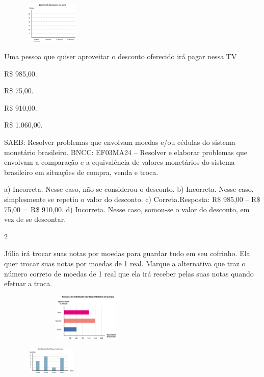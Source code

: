 \begin{escolha}
{\begin{escolha}
\includegraphics[width=1.95850in,height=0.77507in]{media/image81.png}

Uma pessoa que quiser aproveitar o desconto oferecido irá pagar nessa TV

\begin{escolha}

\item
  R\$ 985,00.
\item
  R\$ 75,00.
\item
  R\$ 910,00.
\item
  R\$ 1.060,00.
\end{escolha}

SAEB: Resolver problemas que envolvam moedas e/ou cédulas do sistema monetário brasileiro. 
BNCC: EF03MA24 -- Resolver e elaborar problemas que envolvam a comparação e a equivalência de
valores monetários do sistema brasileiro em situações de compra, venda e troca.

a) Incorreta. Nesse caso, não se considerou o desconto.
b) Incorreta. Nesse caso, simplesmente se repetiu o valor do desconto.
c) Correta.Resposta: R\$ 985,00 -- R\$ 75,00 = R\$ 910,00.
d) Incorreta. Nesse caso, somou-se o valor do desconto, em vez de se descontar.

\num{2}

Júlia irá trocar suas notas por moedas para guardar tudo em seu
cofrinho. Ela quer trocar suas notas por moedas de 1 real. Marque a
alternativa que traz o número correto de moedas de 1 real que ela
irá receber pelas suas notas quando efetuar a troca.


\includegraphics[width=3.34196in,height=0.88341in]{media/image82.png}

\begin{escolha}

\item
\includegraphics[width=1.93350in,height=0.50004in]{media/image83.png}


\end{escolha}
\end{escolha}}
\end{escolha}
